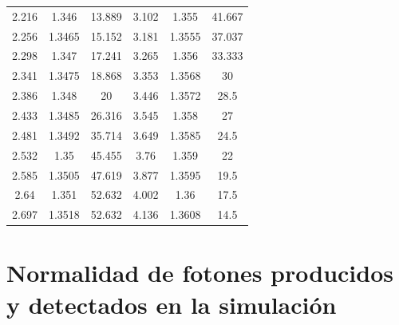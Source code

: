 \documentclass{book}
\begin{document}
\begin{table}[h]
\begin{tabular}{c c c | c c c}
2.216                     & 1.346                    & 13.889                    & 3.102                     & 1.355                    & 41.667                    \\
2.256                     & 1.3465                   & 15.152                    & 3.181                     & 1.3555                   & 37.037                    \\
2.298                     & 1.347                    & 17.241                    & 3.265                     & 1.356                    & 33.333                    \\
2.341                     & 1.3475                   & 18.868                    & 3.353                     & 1.3568                   & 30                        \\
2.386                     & 1.348                    & 20                        & 3.446                     & 1.3572                   & 28.5                      \\
2.433                     & 1.3485                   & 26.316                    & 3.545                     & 1.358                    & 27                        \\
2.481                     & 1.3492                   & 35.714                    & 3.649                     & 1.3585                   & 24.5                      \\
2.532                     & 1.35                     & 45.455                    & 3.76                      & 1.359                    & 22                        \\
2.585                     & 1.3505                   & 47.619                    & 3.877                     & 1.3595                   & 19.5                      \\
2.64                      & 1.351                    & 52.632                    & 4.002                     & 1.36                     & 17.5                      \\
2.697                     & 1.3518                   & 52.632                    & 4.136                     & 1.3608                   & 14.5 \\

 \hline
\hline

\hline
\end{tabular}
\end{table}

\section{Normalidad de fotones producidos y detectados en la simulaci\'on}
\end{document}

